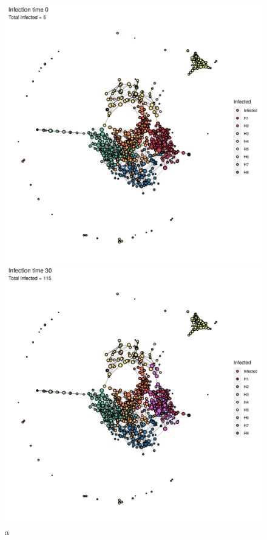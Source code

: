 \begin{figure}[ht]
    \centering
    \begin{minipage}[b]{0.45\linewidth}
        \includegraphics[width=\linewidth]{figures/Networks/Video/Graph_Infection_0_Infected___manual.png}
        \caption{a}
    \end{minipage}
    \hfill
    \begin{minipage}[b]{0.45\linewidth}
        \includegraphics[width=\linewidth]{figures/Networks/Video/Graph_Infection_30_Infected___manual.png}

\end{minipage}
\end{figure}

